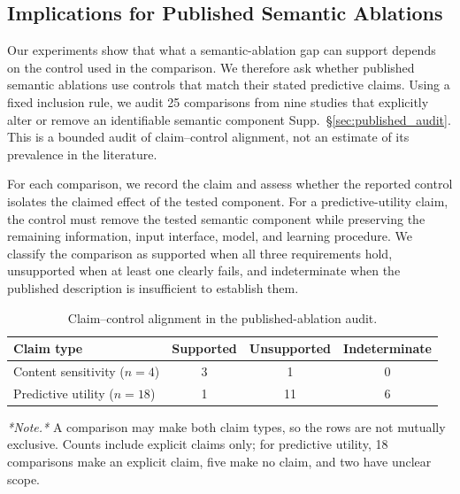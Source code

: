 \documentclass{article} %
\newcommand{\supp}[1]{\textnormal{Supp.~#1}}
\begin{document}
\subsection{Implications for Published Semantic Ablations}
\label{sec:broader_scope}

Our experiments show that what a semantic-ablation gap can support depends on the control used in the comparison.
We therefore ask whether published semantic ablations use controls that match their stated predictive claims.
Using a fixed inclusion rule, we audit 25 comparisons from nine studies that explicitly alter or remove an identifiable semantic component \supp{\S\ref{sec:published_audit}}.
This is a bounded audit of claim--control alignment, not an estimate of its prevalence in the literature.

For each comparison, we record the claim and assess whether the reported control isolates the claimed effect of the tested component.
For a predictive-utility claim, the control must remove the tested semantic component while preserving the remaining information, input interface, model, and learning procedure.
We classify the comparison as supported when all three requirements hold, unsupported when at least one clearly fails, and indeterminate when the published description is insufficient to establish them.

\begin{table}[!ht]
\centering
\vspace{-0.4em}

\caption{Claim--control alignment in the published-ablation audit.}
\label{tab:published_audit}
\vspace{0.1em}

\fontsize{8pt}{9pt}\selectfont
\setlength{\tabcolsep}{3pt}
\renewcommand{\arraystretch}{0.95}

\begin{tabular}{@{}lccc@{}}
\toprule
Claim type & Supported & Unsupported & Indeterminate \\
\midrule
Content sensitivity ($n=4$) & 3 & 1 & 0 \\
Predictive utility ($n=18$) & 1 & 11 & 6 \\
\bottomrule
\end{tabular}

\vspace{1pt}

{\scriptsize \emph{*Note.*} A comparison may make both claim types, so the rows are not mutually exclusive.
Counts include explicit claims only; for predictive utility, 18 comparisons make an explicit claim, five make no claim, and two have unclear scope.}

\vspace{-0.5em}
\end{table}
\end{document}
